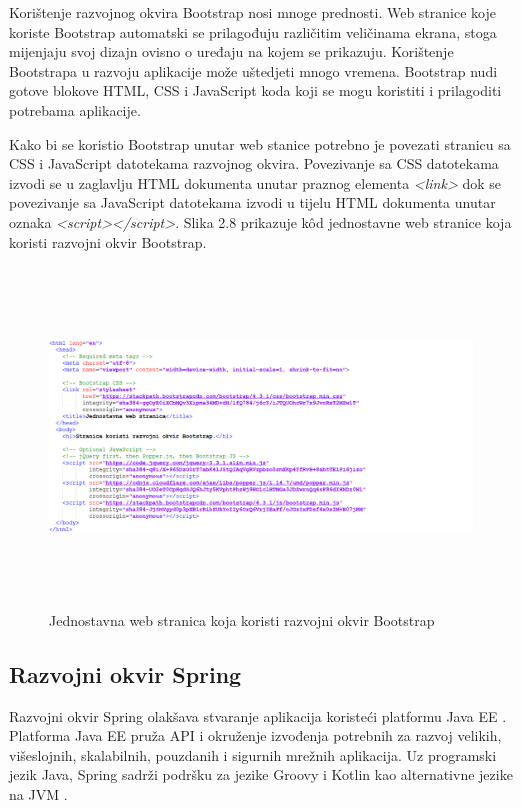 \documentclass[times, utf8, zavrsni, numeric]{fer}
\begin{document}
Korištenje razvojnog okvira Bootstrap nosi mnoge prednosti. Web stranice koje koriste Bootstrap automatski se prilagođuju različitim veličinama ekrana, stoga mijenjaju svoj dizajn ovisno o uređaju na kojem se prikazuju. Korištenje Bootstrapa u razvoju aplikacije može uštedjeti mnogo vremena. Bootstrap nudi gotove blokove HTML, CSS i JavaScript koda koji se mogu koristiti i prilagoditi potrebama aplikacije.  

Kako bi se koristio Bootstrap unutar web stanice potrebno je povezati stranicu sa CSS i JavaScript datotekama razvojnog okvira. Povezivanje sa CSS datotekama izvodi se u zaglavlju HTML dokumenta unutar praznog elementa \emph{<link>} dok se povezivanje sa JavaScript datotekama izvodi u tijelu HTML dokumenta unutar oznaka \emph{<script></script>}. Slika 2.8 prikazuje kôd jednostavne web stranice koja koristi razvojni okvir Bootstrap.
\begin{figure}[htb]
\includegraphics[height=9cm]{basic-bootstrap.png}
\caption{Jednostavna web stranica koja koristi razvojni okvir Bootstrap\cite{Introduc43:online}}
\label{fig:basicBs}
\end{figure}

\subsection{Razvojni okvir Spring}
Razvojni okvir Spring olakšava stvaranje aplikacija koristeći platformu Java EE . Platforma Java EE pruža API i  okruženje izvođenja potrebnih za razvoj velikih, višeslojnih, skalabilnih, pouzdanih i sigurnih mrežnih aplikacija\cite{Differen48:online}. Uz programski jezik Java, Spring sadrži podršku za jezike Groovy i Kotlin kao alternativne jezike na JVM .
\end{document}

